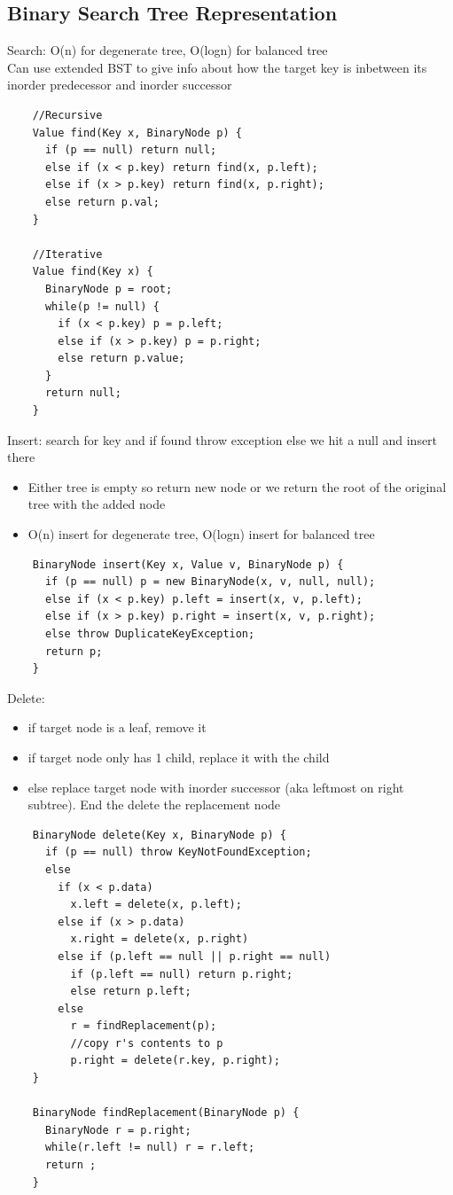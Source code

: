 \documentclass{article}
\begin{document}
  \subsection{Binary Search Tree Representation}
  Search: O(n) for degenerate tree, O(logn) for balanced tree \\
  Can use extended BST to give info about how the target key is inbetween its inorder predecessor and inorder successor
  \begin{lstlisting}
    //Recursive
    Value find(Key x, BinaryNode p) {
      if (p == null) return null;
      else if (x < p.key) return find(x, p.left);
      else if (x > p.key) return find(x, p.right);
      else return p.val;
    }

    //Iterative
    Value find(Key x) {
      BinaryNode p = root;
      while(p != null) {
        if (x < p.key) p = p.left;
        else if (x > p.key) p = p.right;
        else return p.value;
      }
      return null;
    }
  \end{lstlisting}
  Insert: search for key and if found throw exception else we hit a null and insert there 
  \begin{itemize}[noitemsep]
  \item Either tree is empty so return new node or we return the root of the original tree with the added node
  \item O(n) insert for degenerate tree, O(logn) insert for balanced tree
  \end{itemize}
  \begin{lstlisting}
    BinaryNode insert(Key x, Value v, BinaryNode p) {
      if (p == null) p = new BinaryNode(x, v, null, null);
      else if (x < p.key) p.left = insert(x, v, p.left);
      else if (x > p.key) p.right = insert(x, v, p.right);
      else throw DuplicateKeyException;
      return p;
    }
  \end{lstlisting}
  \newpage
  \noindent Delete: 
  \begin{itemize}[noitemsep]
    \item if target node is a leaf, remove it
    \item if target node only has 1 child, replace it with the child
    \item else replace target node with inorder successor (aka leftmost on right subtree). End the delete the replacement node
  \end{itemize} 
  \begin{lstlisting} 
    BinaryNode delete(Key x, BinaryNode p) {
      if (p == null) throw KeyNotFoundException;
      else 
        if (x < p.data)
          x.left = delete(x, p.left);
        else if (x > p.data)
          x.right = delete(x, p.right)
        else if (p.left == null || p.right == null) 
          if (p.left == null) return p.right;
          else return p.left;
        else 
          r = findReplacement(p);
          //copy r's contents to p
          p.right = delete(r.key, p.right);
    }

    BinaryNode findReplacement(BinaryNode p) {
      BinaryNode r = p.right;
      while(r.left != null) r = r.left;
      return ;
    }
  \end{lstlisting}
\end{document}
